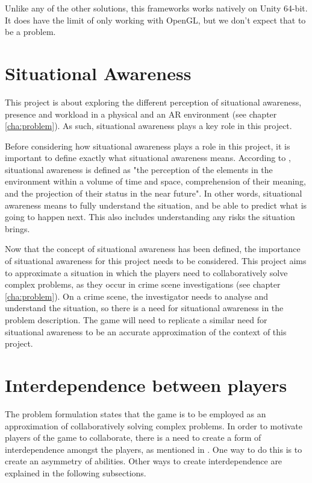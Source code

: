 				Unlike any of the other solutions, this frameworks works
				natively on Unity 64-bit. It does have the limit of only working
				with OpenGL, but we don't expect that to be a problem.


	\section{Situational Awareness} \label{sec:awareness}
		This project is about exploring the different perception of situational
		awareness, presence and workload in a physical and an AR environment
		(see chapter \ref{cha:problem}). As such, situational awareness plays a
		key role in this project.

		Before considering how situational awareness plays a role in this project,
		it is important to define exactly what situational awareness means.
		According to \cite{endsley}, situational awareness is defined as "the
		perception of the elements in the environment within a volume of time and
		space, comprehension of their meaning, and the projection of their status in
		the near future". In other words, situational awareness means to
		fully understand the situation, and be able to predict what is going to
		happen next. This also includes understanding any risks the situation brings.

		Now that the concept of situational awareness has been defined, the
		importance of situational awareness for this project needs to be considered.
		This project aims to approximate a situation in which the players need to
		collaboratively solve complex problems, as they occur in crime scene
		investigations (see chapter \ref{cha:problem}). On a crime scene, the
		investigator needs to analyse and understand the situation, so there is a
		need for situational awareness in the problem description. The game will need
		to replicate a similar need for situational awareness to be an accurate
		approximation of the context of this project.

	\section{Interdependence between players} \label{sec:interdependence}
		The problem formulation states that the game is to be employed as an
		approximation of collaboratively solving complex problems. In order to
		motivate players of the game to collaborate, there is a need to create
		a form of interdependence amongst the players, as mentioned in \cite{zagal}. One way to do this is to
		create an asymmetry of abilities. Other ways to create interdependence
		are explained in the following subsections.

